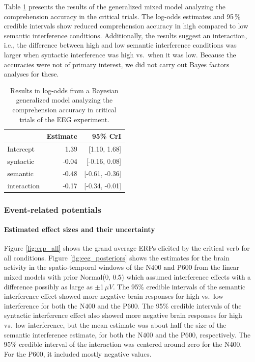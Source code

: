 \documentclass[review,preprint,12pt,authoryear,floatsintext]{elsarticle}
\begin{document}
Table \ref{tab:eeg_acc_mod} presents the results of the generalized mixed model analyzing the comprehension accuracy in the critical trials. The log-odds estimates and 95\,\% credible intervals show reduced comprehension accuracy in high compared to low semantic interference conditions. Additionally, the results suggest an interaction, i.e., the difference between high and low semantic interference conditions was larger when syntactic interference was high vs.\ when it was low. Because the accuracies were not of primary interest, we did not carry out Bayes factors analyses for these.

\begin{table}[ht]
    \caption{Results in log-odds from a Bayesian generalized model analyzing the comprehension accuracy in critical trials of the EEG experiment.}
    \label{tab:eeg_acc_mod}
    \centering
    \begin{tabular}{lrr}
    \toprule
    & Estimate &  95\% CrI  \\
    \midrule
Intercept& 1.39 &   [1.10, 1.68]\\
syntactic& -0.04 &  [-0.16, 0.08]\\
semantic&  -0.48 & [-0.61, -0.36]\\
interaction& -0.17&  [-0.34, -0.01]\\
    \bottomrule
    \end{tabular}
\end{table}

\subsubsection*{Event-related potentials}

\paragraph{Estimated effect sizes and their uncertainty}

Figure \ref{fig:erp_all} shows the 
grand average ERPs elicited by the critical verb for all conditions. Figure \ref{fig:eeg_posteriors} shows the estimates for the brain activity in the spatio-temporal windows of the N400 and P600 from the linear mixed models with prior Normal(0, 0.5) which assumed interference effects with a difference possibly as large as $\pm$1\,$\mu V$. {The 95\% credible intervals of the semantic interference effect showed more negative brain responses for high vs.\ low interference for both the N400 and the P600. The 95\% credible intervals of the syntactic interference effect also showed more negative brain responses for high vs.\ low interference, but the mean estimate was about half the size of the semantic interference estimate, for both the N400 and the P600, respectively. The 95\% credible interval of the interaction was centered around zero for the N400. For the P600, it included mostly negative values.}\label{ERP_results1}
\end{document}
